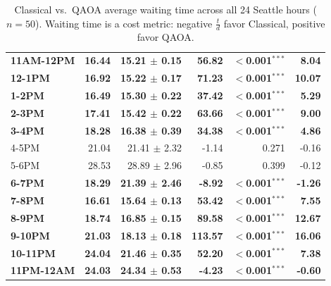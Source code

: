 \documentclass[12pt]{article}
\begin{document}
\begin{table}[H]
\begin{tabular}{lrrrrr}
{\boldmath\bfseries 11AM-12PM} & {\boldmath\bfseries 16.44} & {\boldmath\bfseries 15.21 $\pm$ 0.15} & {\boldmath\bfseries 56.82} & {\boldmath\bfseries $<$0.001$^{***}$} & {\boldmath\bfseries 8.04} \\
{\boldmath\bfseries 12-1PM} & {\boldmath\bfseries 16.92} & {\boldmath\bfseries 15.22 $\pm$ 0.17} & {\boldmath\bfseries 71.23} & {\boldmath\bfseries $<$0.001$^{***}$} & {\boldmath\bfseries 10.07} \\
{\boldmath\bfseries 1-2PM} & {\boldmath\bfseries 16.49} & {\boldmath\bfseries 15.30 $\pm$ 0.22} & {\boldmath\bfseries 37.42} & {\boldmath\bfseries $<$0.001$^{***}$} & {\boldmath\bfseries 5.29} \\
{\boldmath\bfseries 2-3PM} & {\boldmath\bfseries 17.41} & {\boldmath\bfseries 15.42 $\pm$ 0.22} & {\boldmath\bfseries 63.66} & {\boldmath\bfseries $<$0.001$^{***}$} & {\boldmath\bfseries 9.00} \\
{\boldmath\bfseries 3-4PM} & {\boldmath\bfseries 18.28} & {\boldmath\bfseries 16.38 $\pm$ 0.39} & {\boldmath\bfseries 34.38} & {\boldmath\bfseries $<$0.001$^{***}$} & {\boldmath\bfseries 4.86} \\
4-5PM & 21.04 & 21.41 $\pm$ 2.32 & -1.14 & 0.271 & -0.16 \\
5-6PM & 28.53 & 28.89 $\pm$ 2.96 & -0.85 & 0.399 & -0.12 \\
{\boldmath\bfseries 6-7PM} & {\boldmath\bfseries 18.29} & {\boldmath\bfseries 21.39 $\pm$ 2.46} & {\boldmath\bfseries -8.92} & {\boldmath\bfseries $<$0.001$^{***}$} & {\boldmath\bfseries -1.26} \\
{\boldmath\bfseries 7-8PM} & {\boldmath\bfseries 16.61} & {\boldmath\bfseries 15.64 $\pm$ 0.13} & {\boldmath\bfseries 53.42} & {\boldmath\bfseries $<$0.001$^{***}$} & {\boldmath\bfseries 7.55} \\
{\boldmath\bfseries 8-9PM} & {\boldmath\bfseries 18.74} & {\boldmath\bfseries 16.85 $\pm$ 0.15} & {\boldmath\bfseries 89.58} & {\boldmath\bfseries $<$0.001$^{***}$} & {\boldmath\bfseries 12.67} \\
{\boldmath\bfseries 9-10PM} & {\boldmath\bfseries 21.03} & {\boldmath\bfseries 18.13 $\pm$ 0.18} & {\boldmath\bfseries 113.57} & {\boldmath\bfseries $<$0.001$^{***}$} & {\boldmath\bfseries 16.06} \\
{\boldmath\bfseries 10-11PM} & {\boldmath\bfseries 24.04} & {\boldmath\bfseries 21.46 $\pm$ 0.35} & {\boldmath\bfseries 52.20} & {\boldmath\bfseries $<$0.001$^{***}$} & {\boldmath\bfseries 7.38} \\
{\boldmath\bfseries 11PM-12AM} & {\boldmath\bfseries 24.03} & {\boldmath\bfseries 24.34 $\pm$ 0.53} & {\boldmath\bfseries -4.23} & {\boldmath\bfseries $<$0.001$^{***}$} & {\boldmath\bfseries -0.60} \\
\bottomrule
\end{tabular}
\caption{Classical vs.\ QAOA average waiting time across all 24 Seattle hours ($n=50$).
Waiting time is a cost metric: negative $\frac{t}{d}$ favor Classical, positive favor QAOA.}
\label{tab:classical_vs_qaoa_seattle_average_waiting_time}
\end{table}
\end{document}
